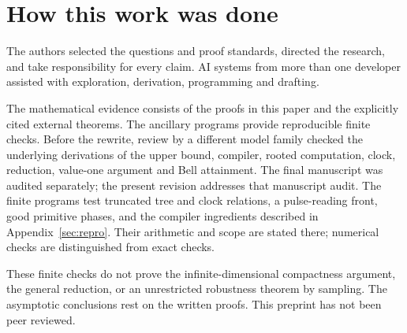 \section*{How this work was done}\label{sec:methods}

The authors selected the questions and proof standards, directed the research, and take responsibility for every claim. AI systems from more than one developer assisted with exploration, derivation, programming and drafting.

The mathematical evidence consists of the proofs in this paper and the explicitly cited external theorems. The ancillary programs provide reproducible finite checks. Before the rewrite, review by a different model family checked the underlying derivations of the upper bound, compiler, rooted computation, clock, reduction, value-one argument and Bell attainment. The final manuscript was audited separately; the present revision addresses that manuscript audit. The finite programs test truncated tree and clock relations, a pulse-reading front, good primitive phases, and the compiler ingredients described in Appendix~\ref{sec:repro}. Their arithmetic and scope are stated there; numerical checks are distinguished from exact checks.

These finite checks do not prove the infinite-dimensional compactness argument, the general reduction, or an unrestricted robustness theorem by sampling. The asymptotic conclusions rest on the written proofs. This preprint has not been peer reviewed.
